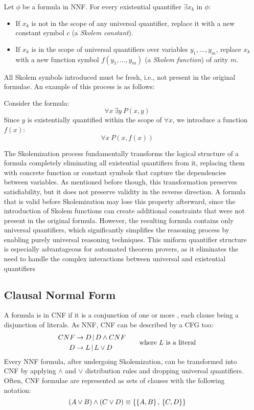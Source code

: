 Let \(\phi\) be a formula in NNF\@. For every existential quantifier \(\exists x_k\) in \(\phi\):
\begin{itemize}
  \item If \(x_k\) is not in the scope of any universal quantifier, replace it with a new constant symbol \(c\) (a \emph{Skolem constant}).
  \item If \(x_k\) is in the scope of universal quantifiers over variables \(y_1, \dots, y_m\), replace \(x_k\) with a new function symbol \(f(y_1, \dots, y_m)\) (a \emph{Skolem function}) of arity \(m\).
\end{itemize}
All Skolem symbols introduced must be fresh, i.e., not present in the original formulae.
An example of this process is as follows:

Consider the formula:
\[
\forall x \: \exists y \: P(x, y)
\]
Since \(y\) is existentially quantified within the scope of \(\forall x\), we introduce a function \(f(x)\):
\[
\forall x \: P(x, f(x))
\]

The Skolemization process fundamentally transforms the logical structure of a formula completely eliminating all existential quantifiers from it, replacing them with concrete function or constant symbols that capture the dependencies between variables.
As mentioned before though, this transformation preserves satisfiability, but it does not preserve validity in the reverse direction.
A formula that is valid before Skolemization may lose this property afterward, since the introduction of Skolem functions can create additional constraints that were not present in the original formula.
However, the resulting formula contains only universal quantifiers, which significantly simplifies the reasoning process by enabling purely universal reasoning techniques. 
This uniform quantifier structure is especially advantageous for automated theorem provers, as it eliminates the need to handle the complex interactions between universal and existential quantifiers%

\subsection{Clausal Normal Form}\label{subsec:clausal_normal_form}
A formula is in CNF if it is a conjunction of one or more , each clause being a disjunction of literals.  
As NNF, CNF can be described by a CFG too:
\begin{equation}
  \begin{aligned}
    CNF &\to D  \, | \,  D \land CNF \\
      D &\to L  \, | \,  L \lor D
  \end{aligned}
  \qquad \text{where } L \text{ is a literal}
\end{equation}
Every NNF formula, after undergoing Skolemization, can be transformed into CNF by applying \(\land\) and \(\lor\) distribution rules and dropping universal quantifiers.
Often, CNF formulae are represented as sets of clauses with the following notation:
\[
(A \lor B) \land (C \lor D) \equiv \{\{A , B\} \, , \, \{C , D\}\}
\]

